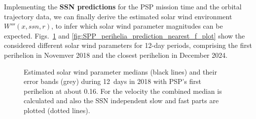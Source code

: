 Implementing the \textbf{SSN predictions} for the PSP mission time and the orbital trajectory data, we can finally derive the estimated solar wind environment $W'''(x,ssn,r)$, to infer which solar wind parameter magnitudes can be expected. Figs.~\ref{fig:SPP_perihelia_prediction_f_plot} and \ref{fig:SPP_perihelia_prediction_nearest_f_plot} show the considered different solar wind parameters for 12-day periods, comprising the first perihelion in Novemver 2018 and the closest perihelion in December 2024.
\begin{figure}
	\caption{Estimated solar wind parameter medians (black lines) and their error bands (grey) during 12~days in 2018 with PSP's first perihelion at about \SI{0.16}{\au}. For the velocity the combined median is calculated and also the SSN independent slow and fast parts are plotted (dotted lines).}
	\label{fig:SPP_perihelia_prediction_f_plot}
\end{figure}
